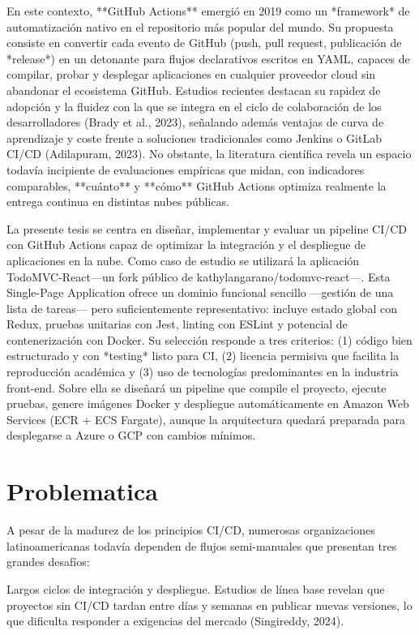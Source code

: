 En este contexto, **GitHub Actions** emergió en 2019 como un *framework* de automatización nativo en el repositorio más popular del mundo. Su propuesta consiste en convertir cada evento de GitHub (push, pull request, publicación de *release*) en un detonante para flujos declarativos escritos en YAML, capaces de compilar, probar y desplegar aplicaciones en cualquier proveedor cloud sin abandonar el ecosistema GitHub. Estudios recientes destacan su rapidez de adopción y la fluidez con la que se integra en el ciclo de colaboración de los desarrolladores (Brady et al., 2023), señalando además ventajas de curva de aprendizaje y coste frente a soluciones tradicionales como Jenkins o GitLab CI/CD (Adilapuram, 2023). No obstante, la literatura científica revela un espacio todavía incipiente de evaluaciones empíricas que midan, con indicadores comparables, **cuánto** y **cómo** GitHub Actions optimiza realmente la entrega continua en distintas nubes públicas.

La presente tesis se centra en diseñar, implementar y evaluar un pipeline CI/CD con GitHub Actions capaz de optimizar la integración y el despliegue de aplicaciones en la nube. Como caso de estudio se utilizará la aplicación TodoMVC-React—un fork público de kathylangarano/todomvc-react—. Esta Single-Page Application ofrece un dominio funcional sencillo —gestión de una lista de tareas— pero suficientemente representativo: incluye estado global con Redux, pruebas unitarias con Jest, linting con ESLint y potencial de contenerización con Docker. Su selección responde a tres criterios: (1) código bien estructurado y con *testing* listo para CI, (2) licencia permisiva que facilita la reproducción académica y (3) uso de tecnologías predominantes en la industria front-end. Sobre ella se diseñará un pipeline que compile el proyecto, ejecute pruebas, genere imágenes Docker y despliegue automáticamente en Amazon Web Services (ECR + ECS Fargate), aunque la arquitectura quedará preparada para desplegarse a Azure o GCP con cambios mínimos.

\section{Problematica}

A pesar de la madurez de los principios CI/CD, numerosas organizaciones latinoamericanas todavía dependen de flujos semi-manuales que presentan tres grandes desafíos:

Largos ciclos de integración y despliegue. Estudios de línea base revelan que proyectos sin CI/CD tardan entre días y semanas en publicar nuevas versiones, lo que dificulta responder a exigencias del mercado (Singireddy, 2024).

